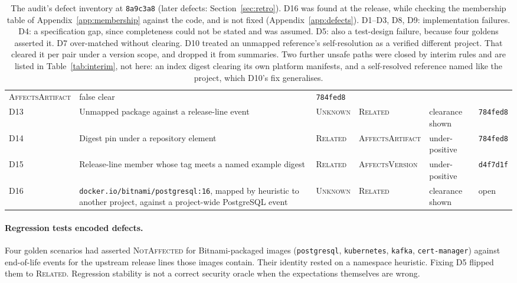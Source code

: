 \documentclass[11pt,a4paper]{article}
\newcommand{\code}[1]{\texttt{#1}}
\newcommand{\dtwelvecommit}{\code{784fed8}}
\newcommand{\dfifteencommit}{\code{d4f7d1f}}
\newcommand{\pincommit}{\code{8a9c3a8}}
\begin{document}
\begin{table}[t]
\begin{tabularx}{\linewidth}{@{}l >{\raggedright\arraybackslash}X >{\raggedright\arraybackslash}p{2.0cm} >{\raggedright\arraybackslash}p{2.0cm} >{\raggedright\arraybackslash}p{1.7cm} l@{}}
  \textsc{Affects\-Artifact} & false clear & \dtwelvecommit{} \\
D13 & Unmapped package against a release-line event & \textsc{Unknown}
  & \textsc{Related} & clearance shown & \dtwelvecommit{} \\
D14 & Digest pin under a repository element & \textsc{Related} &
  \textsc{Affects\-Artifact} & under-positive & \dtwelvecommit{} \\
D15 & Release-line member whose tag meets a named example digest &
  \textsc{Related} & \textsc{Affects\-Version} & under-positive &
  \dfifteencommit{} \\
D16 & \code{docker.io/bitnami/postgresql:16}, mapped by heuristic to
  another project, against a project-wide PostgreSQL event &
  \textsc{Unknown} & \textsc{Related} & clearance shown & open \\
\bottomrule
\end{tabularx}
\caption{The audit's defect inventory at \pincommit{} (later defects:
Section~\ref{sec:retro}). D16 was found at the release, while checking
the membership table of Appendix~\ref{app:membership} against the
code, and is not fixed (Appendix~\ref{app:defects}). D1--D3, D8, D9: implementation
failures. D4: a specification gap, since completeness could not be
stated and was assumed. D5: also a test-design failure, because four
goldens asserted it. D7 over-matched without clearing. D10 treated
an unmapped reference's self-resolution as a verified different
project. That cleared it per pair under a version scope, and dropped
it from summaries. Two further unsafe paths were closed by interim
rules and are listed in Table~\ref{tab:interim}, not here: an index
digest clearing its own platform manifests, and a self-resolved
reference named like the project, which D10's fix generalises.}
\label{tab:defects}
\end{table}

\paragraph{Regression tests encoded defects.} Four golden scenarios had
asserted \textsc{NotAffected} for Bitnami-packaged images
(\code{postgresql}, \code{kubernetes}, \code{kafka},
\code{cert-manager}) against end-of-life events for the upstream
release lines those images contain. Their identity rested on a
namespace heuristic. Fixing D5 flipped them to \textsc{Related}.
Regression stability is not a correct security oracle when the
expectations themselves are wrong.
\end{document}
